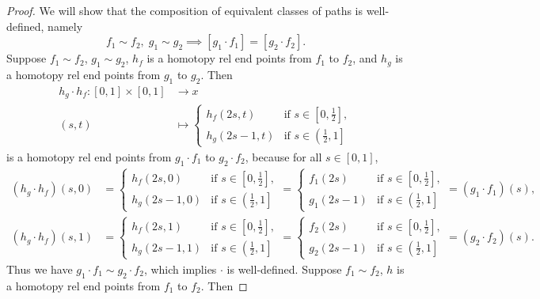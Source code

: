 \documentclass{report}
\theoremstyle{nonumberplain}
\newtheorem{proof}{Proof.}
\begin{document}
\begin{proof}
	We will show that the composition of equivalent classes of paths is well-defined, namely 
	\[
		f_1\sim f_2,\;g_1\sim g_2\implies [g_1\cdot f_1] = [g_2\cdot f_2].
	\]
	Suppose $f_1\sim f_2$, $g_1\sim g_2$, $h_f$ is a homotopy rel end points from $f_1$ to $f_2$, and $h_g$ is a homotopy rel end points from $g_1$ to $g_2$. Then
	\begin{align*}
		h_g\cdot h_f:[0,1]\times [0,1] &\longrightarrow x\\
		(s,t) &\longmapsto \begin{cases}
			h_f(2s, t)&\text{if }s\in\left[0,\frac{1}{2}\right],\\
			h_g(2s-1, t)&\text{if }s\in\left(\left.\frac{1}{2},1\right]\right.
		\end{cases}
	\end{align*}
	is a homotopy rel end points from $g_1\cdot f_1$ to $g_2\cdot f_2$, because for all $s\in[0,1]$,
	\[\begin{aligned}
		\left(h_g\cdot h_f\right)(s, 0)&=\begin{cases}
			h_f(2s, 0)&\text{if }s\in\left[0,\frac{1}{2}\right],\\
			h_g(2s-1, 0)&\text{if }s\in\left(\left.\frac{1}{2},1\right]\right.
		\end{cases}=\begin{cases}
			f_1(2s)&\text{if }s\in\left[0,\frac{1}{2}\right],\\
			g_1(2s-1)&\text{if }s\in\left(\left.\frac{1}{2},1\right]\right.
		\end{cases}=\left(g_1\cdot f_1\right)(s),\\
		\left(h_g\cdot h_f\right)(s, 1)&=\begin{cases}
			h_f(2s, 1)&\text{if }s\in\left[0,\frac{1}{2}\right],\\
			h_g(2s-1, 1)&\text{if }s\in\left(\left.\frac{1}{2},1\right]\right.
		\end{cases}=\begin{cases}
			f_2(2s)&\text{if }s\in\left[0,\frac{1}{2}\right],\\
			g_2(2s-1)&\text{if }s\in\left(\left.\frac{1}{2},1\right]\right.
		\end{cases}=\left(g_2\cdot f_2\right)(s).
	\end{aligned}\]
	Thus we have $g_1\cdot f_1\sim g_2\cdot f_2$, which implies $\cdot$ is well-defined.
	Suppose $f_1\sim f_2$, $h$ is a homotopy rel end points from $f_1$ to $f_2$. Then

\end{proof}
\end{document}
